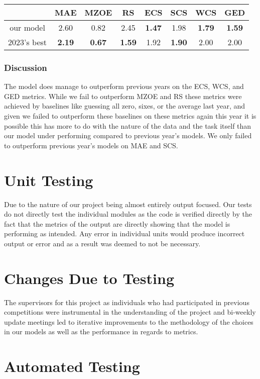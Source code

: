 \documentclass[12pt, titlepage]{article}
\begin{document}
\begin{tabular}{c|ccccccc}
  &  MAE   & MZOE  & RS    & ECS   & SCS   & WCS   & GED \\ \hline
our model  & 2.60  & 0.82  & 2.45  & \textbf{1.47}  & 1.98  & \textbf{1.79}  & \textbf{1.59} \\
2023's best  & \textbf{2.19}  & \textbf{0.67}  & \textbf{1.59}  & 1.92  & \textbf{1.90}  & 2.00  & 2.00 \\
\end{tabular}

\subsubsection{Discussion}
The model does manage to outperform previous years on the ECS, WCS, and GED metrics. While we fail to outperform MZOE and RS these metrics were achieved by baselines like guessing all zero, sixes, or the average last year, and given we failed to outperform these baselines on these metrics again this year it is possible this has more to do with the nature of the data and the task itself than our model under performing compared to previous year's models. We only failed to outperform previous year's models on MAE and SCS.


\section{Unit Testing}

Due to the nature of our project being almost entirely output focused. Our
tests do not directly test the individual modules as the code is verified directly by the
fact that the metrics of the output are directly showing that the model is
performing as intended. Any error in individual units would produce incorrect output or error and as a result was deemed to not be necessary. 

\section{Changes Due to Testing}

The supervisors for this project as individuals who had participated in previous competitions were instrumental in the understanding of the project and bi-weekly update meetings led to iterative improvements to the methodology of the choices in our models as well as the performance in regards to metrics.

\section{Automated Testing}
\end{document}
